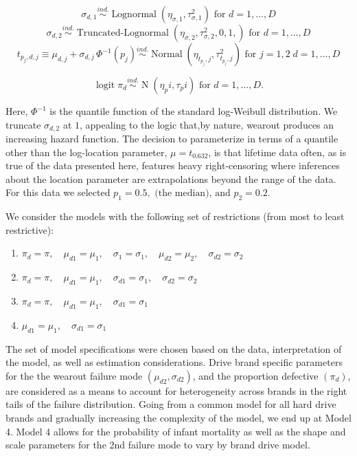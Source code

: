 \documentclass[12pt]{article}
\newcommand{\ind}{\stackrel{ind.}{\sim}}
\newcommand{\op}{\operatorname}
\begin{document}
$$\sigma_{d,1} \ind \op{Lognormal} \left( \eta_{\sigma,1}, \tau^2_{\sigma,1} \right) \mbox{ for } d=1,\ldots,D$$
$$\sigma_{d,2} \ind \op{Truncated-Lognormal} \left( \eta_{\sigma,2}, \tau^2_{\sigma,2} , 0, 1, \right) \mbox{ for } d=1,\ldots,D$$
$$t_{p_j,d,j} \equiv \mu_{d,j} + \sigma_{d,j}\,\Phi^{-1}(p_j)  \ind \op{Normal} \left(\eta_{t_{p_j},j}, \tau^2_{t_{p_j},j}\right) \mbox{ for } j=1,2\; d=1,\ldots,D$$

$$\op{logit} \pi_d \ind \op{N}(\eta_pi, \tau_pi) \mbox{ for } d=1,\ldots,D.$$

Here, $\Phi^{-1}$ is the quantile function of the standard log-Weibull distribution. We truncate $\sigma_{d,2}$ at $1$, appealing to the logic that,by nature, wearout produces an increasing hazard function. The decision to parameterize in terms of a quantile other than the log-location parameter, $\mu = t_{0.632}$, is that lifetime data often, as is true of the data presented here, features heavy right-censoring where inferences about the location parameter are extrapolations beyond the range of the data. For this data we selected $p_1=0.5,\mbox{ (the median), and } p_2 = 0.2$.

We consider the models with the following set of restrictions (from most to least restrictive):

\begin{enumerate}
\item $\pi_{d} = \pi,\quad \mu_{d1} = \mu_1,\quad \sigma_{1}=\sigma_1,\quad \mu_{d2} = \mu_2,\quad \sigma_{d2} = \sigma_2$
\item $\pi_{d} = \pi,\quad \mu_{d1} = \mu_1,\quad \sigma_{d1}=\sigma_1,\quad \sigma_{d2} = \sigma_2$
\item $\pi_{d} = \pi,\quad \mu_{d1} = \mu_1,\quad \sigma_{d1}=\sigma_1$
\item $\mu_{d1} = \mu_1,\quad \sigma_{d1}=\sigma_1$
\end{enumerate}

The set of model specifications were chosen based on the data, interpretation of the model, as well as estimation considerations. Drive brand specific parameters for the the wearout failure mode $(\mu_{d2},\sigma_{d2})$, and the proportion defective $(\pi_d)$, are considered as a means to account for heterogeneity across brands in the right tails of the failure distribution.  Going from a common model for all hard drive brands and gradually increasing the complexity of the model, we end up at Model 4.  Model 4 allows for the probability of infant mortality as well as the shape and scale parameters for the 2nd failure mode to vary by brand drive model.
\end{document}
